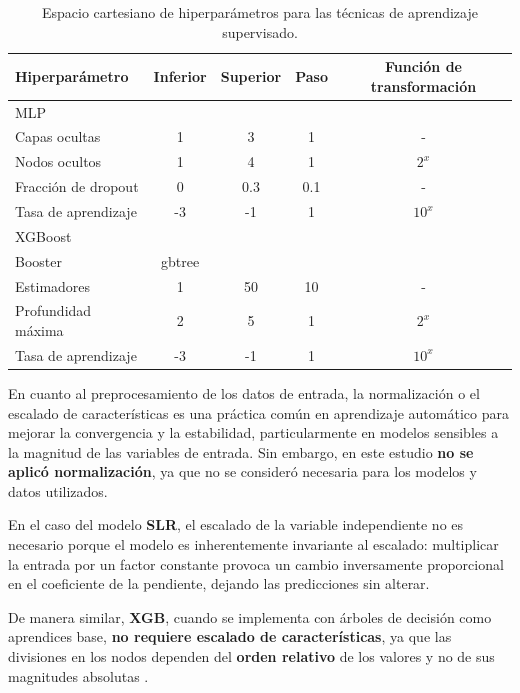 \begin{table}[ht!]
\caption{Espacio cartesiano de hiperparámetros para las técnicas de aprendizaje supervisado.}
\label{tab:gridsearch}
\centering
\resizebox{\linewidth}{!} {
\def\arraystretch{1.5}
\begin{tabular}{lcccc}
\hline
\textbf{Hiperparámetro} & \textbf{Inferior} & \textbf{Superior} & \textbf{Paso} & \textbf{Función de transformación} \\
\hline
MLP\\
\hline
 Capas ocultas        & 1    & 3     & 1   & - \\
 Nodos ocultos        & 1    & 4     & 1   & $2^{x}$ \\
 Fracción de dropout  & 0    & 0.3   & 0.1 & - \\
 Tasa de aprendizaje  & -3   & -1    & 1   & $10^{x}$ \\
\hline
XGBoost\\
\hline
Booster               & gbtree & & & \\
 Estimadores          & 1    & 50    & 10  & - \\
 Profundidad máxima   & 2    & 5     & 1   & $2^{x}$ \\
 Tasa de aprendizaje  & -3   & -1    & 1   & $10^{x}$ \\
\hline
\end{tabular}}
\end{table}

En cuanto al preprocesamiento de los datos de entrada, la normalización o el escalado de características es una práctica común en aprendizaje automático para mejorar la convergencia y la estabilidad, particularmente en modelos sensibles a la magnitud de las variables de entrada. Sin embargo, en este estudio \textbf{no se aplicó normalización}, ya que no se consideró necesaria para los modelos y datos utilizados.  

En el caso del modelo \textbf{SLR}, el escalado de la variable independiente no es necesario porque el modelo es inherentemente invariante al escalado: multiplicar la entrada por un factor constante provoca un cambio inversamente proporcional en el coeficiente de la pendiente, dejando las predicciones sin alterar.  

De manera similar, \textbf{XGB}, cuando se implementa con árboles de decisión como aprendices base, \textbf{no requiere escalado de características}, ya que las divisiones en los nodos dependen del \textbf{orden relativo} de los valores y no de sus magnitudes absolutas \cite{Soria2022, Chen2016}.  

